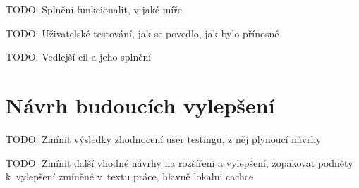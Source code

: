 TODO: Splnění funkcionalit, v jaké míře

TODO: Uživatelské testování, jak se povedlo, jak bylo přínosné

TODO: Vedlejší cíl a jeho splnění


\section*{Návrh budoucích vylepšení}

TODO: Zmínit výsledky zhodnocení user testingu, z něj plynoucí návrhy

TODO: Zmínit další vhodné návrhy na rozšíření a vylepšení, zopakovat podněty k~vylepšení zmíněné v~textu práce, hlavně lokalni cachce



































